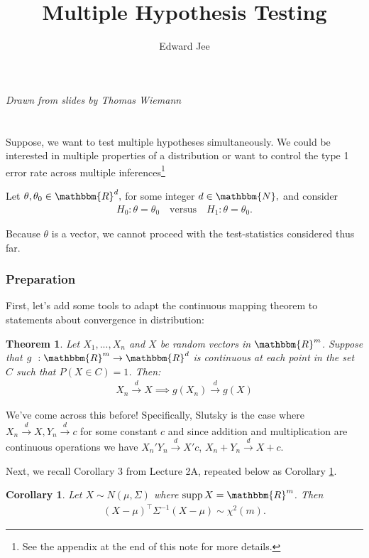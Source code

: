 \documentclass{article}
\author{Edward Jee}
\title{Multiple Hypothesis Testing}
\newtheorem{theorem}{Theorem}
\DeclareMathOperator\supp{supp}
\newtheorem{corollary}{Corollary}[theorem]
\begin{document}
\maketitle

\textit{Drawn from slides by Thomas Wiemann}

\section*{}
Suppose, we want to test multiple hypotheses simultaneously. We could be 
interested in multiple properties of a distribution or want to control the 
type 1 error rate across multiple inferences\footnote{See the appendix at the 
end of this note for more details.}

    
Let $\theta, \theta_0 \in \mathbbm{R}^d, $ for some integer $d \in \mathbbm{N},$ and consider\begin{align}
        H_0: \theta = \theta_0\quad \text{versus} \quad H_1: \theta = \theta_0.
\end{align}
    
    Because $\theta$ is a vector, we cannot proceed with the test-statistics considered thus far. 
    \subsubsection*{Preparation}
    First, let's add some tools to adapt the continuous mapping theorem to 
    statements about convergence in distribution:
    
    \begin{theorem}\label{cmt-d}
        Let $X_1, ..., X_n$ and $X$ be random vectors in $\mathbbm{R}^m$. Suppose 
        that $g \ : \mathbbm{R}^m \rightarrow \mathbbm{R}^d$ is continuous at 
        each point in the set $C$ such that $P(X \in C) = 1$. Then:
        \begin{align*}
            X_n \xrightarrow{d} X \implies g(X_n) \xrightarrow{d} g(X)
        \end{align*}
    \end{theorem}


    We've come across this before! Specifically, Slutsky is the case where 
    $X_n \xrightarrow{d} X, Y_n \xrightarrow{d} c$ for some constant $c$ and
     since addition and 
    multiplication are continuous operations we have $X_n' Y_n \xrightarrow{d} X'c$, 
    $X_n + Y_n \xrightarrow{d} X + c$. 


    Next, we recall Corollary 3 from Lecture 2A, repeated below as Corollary \ref{chisq}. 
    \begin{corollary}\label{chisq}
    Let $X \sim N(\mu, \Sigma)$ where $\supp X = \mathbbm{R}^m$. Then \begin{align}
        (X - \mu)^\top \Sigma^{-1}(X - \mu) \sim \chi^2(m).
    \end{align}  
    \end{corollary}
\end{document}
